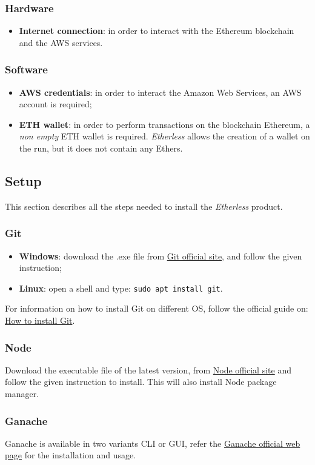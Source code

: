 \subsubsection{Hardware}
\begin{itemize}
	\item \textbf{Internet connection}: in order to interact with the Ethereum blockchain and the AWS services.
\end{itemize}
\subsubsection{Software}
\begin{itemize}
	\item \textbf{AWS credentials}: in order to interact the Amazon Web Services, an AWS account is required;
	\item \textbf{ETH wallet}: in order to perform transactions on the blockchain Ethereum, a \textit{non empty} ETH wallet is required. \textit{Etherless} allows the creation of a wallet on the run, but it does not contain any Ethers.
\end{itemize}
\subsection{Setup}
This section describes all the steps needed to install the \textit{Etherless} product.
\subsubsection{Git}
\begin{itemize}
	\item \textbf{Windows}: download the .exe file from \href{https://git-scm.com/download/win}{Git official site}, and follow the given instruction;
	\item \textbf{Linux}: open a shell and type: \texttt{sudo apt install git}.
\end{itemize}
	For information on how to install Git on different OS, follow the official guide on: \href{https://git-scm.com/book/en/v2/Getting-Started-Installing-Git}{How to install Git}.
\subsubsection{Node}
	Download the executable file of the latest version, from \href{https://nodejs.org/it/download/}{Node official site} and follow the given instruction to install. This will also install Node package manager.
\subsubsection{Ganache}
	Ganache is available in two variants CLI or GUI, refer the \href{https://www.trufflesuite.com/docs/ganache/quickstart}{Ganache official web page} for the installation and usage.
